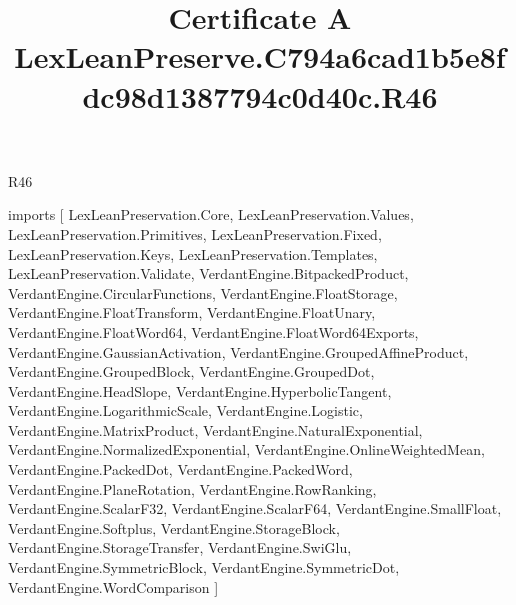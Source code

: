 \begin{lexlean}{R46}
\title{Certificate A LexLeanPreserve.C794a6cad1b5e8fdc98d1387794c0d40c.R46}
\begin{coremodule}
imports [
  LexLeanPreservation.Core,
  LexLeanPreservation.Values,
  LexLeanPreservation.Primitives,
  LexLeanPreservation.Fixed,
  LexLeanPreservation.Keys,
  LexLeanPreservation.Templates,
  LexLeanPreservation.Validate,
  VerdantEngine.BitpackedProduct,
  VerdantEngine.CircularFunctions,
  VerdantEngine.FloatStorage,
  VerdantEngine.FloatTransform,
  VerdantEngine.FloatUnary,
  VerdantEngine.FloatWord64,
  VerdantEngine.FloatWord64Exports,
  VerdantEngine.GaussianActivation,
  VerdantEngine.GroupedAffineProduct,
  VerdantEngine.GroupedBlock,
  VerdantEngine.GroupedDot,
  VerdantEngine.HeadSlope,
  VerdantEngine.HyperbolicTangent,
  VerdantEngine.LogarithmicScale,
  VerdantEngine.Logistic,
  VerdantEngine.MatrixProduct,
  VerdantEngine.NaturalExponential,
  VerdantEngine.NormalizedExponential,
  VerdantEngine.OnlineWeightedMean,
  VerdantEngine.PackedDot,
  VerdantEngine.PackedWord,
  VerdantEngine.PlaneRotation,
  VerdantEngine.RowRanking,
  VerdantEngine.ScalarF32,
  VerdantEngine.ScalarF64,
  VerdantEngine.SmallFloat,
  VerdantEngine.Softplus,
  VerdantEngine.StorageBlock,
  VerdantEngine.StorageTransfer,
  VerdantEngine.SwiGlu,
  VerdantEngine.SymmetricBlock,
  VerdantEngine.SymmetricDot,
  VerdantEngine.WordComparison
]


\end{coremodule}
\end{lexlean}

